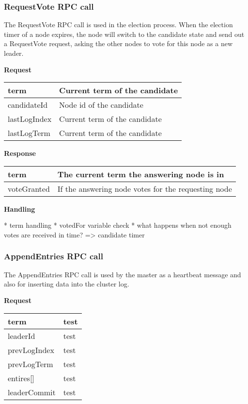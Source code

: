 \subsubsection*{RequestVote RPC call}
The RequestVote RPC call is used in the election process. When the election timer of a node expires, the node will switch to the candidate state and send out a RequestVote request, asking the other nodes to vote for this node as a new leader.

\textbf{Request}

\begin{tabular}{ | l | p{13.7cm} | }
\hline
term & Current term of the candidate \\ \hline
candidateId & Node id of the candidate \\ \hline
lastLogIndex & Current term of the candidate \\ \hline
lastLogTerm & Current term of the candidate \\ \hline
\end{tabular}

\textbf{Response}

\begin{tabular}{ | l | p{13.7cm} | }
\hline
term & The current term the answering node is in \\ \hline
voteGranted & If the answering node votes for the requesting node \\ \hline
\end{tabular}

\textbf{Handling}

* term handling
* votedFor variable check
* what happens when not enough votes are received in time? => candidate timer

\subsubsection*{AppendEntries RPC call}
The AppendEntries RPC call is used by the master as a heartbeat message and also for
inserting data into the cluster log.

\textbf{Request}

\begin{tabular}{ | l | p{12.7cm} | }
\hline
term &  test \\ \hline
leaderId &  test \\ \hline
prevLogIndex &  test \\ \hline
prevLogTerm &  test \\ \hline
entires[] &  test \\ \hline
leaderCommit &  test \\ \hline
\end{tabular}

